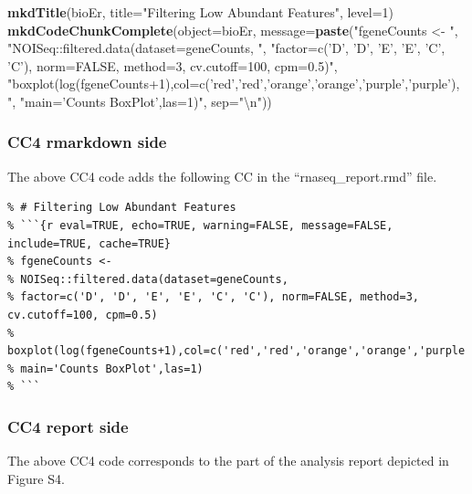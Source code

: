 \documentclass[]{article}
\newenvironment{Shaded}{\begin{snugshade}}{\end{snugshade}}
\newcommand{\CharTok}[1]{\textcolor[rgb]{0.31,0.60,0.02}{#1}}
\newcommand{\DataTypeTok}[1]{\textcolor[rgb]{0.13,0.29,0.53}{#1}}
\newcommand{\DecValTok}[1]{\textcolor[rgb]{0.00,0.00,0.81}{#1}}
\newcommand{\KeywordTok}[1]{\textcolor[rgb]{0.13,0.29,0.53}{\textbf{#1}}}
\newcommand{\NormalTok}[1]{#1}
\newcommand{\StringTok}[1]{\textcolor[rgb]{0.31,0.60,0.02}{#1}}
\begin{document}
\begin{Shaded}
\begin{Highlighting}[]
\KeywordTok{mkdTitle}\NormalTok{(bioEr, }\DataTypeTok{title=}\StringTok{"Filtering Low Abundant Features"}\NormalTok{, }\DataTypeTok{level=}\DecValTok{1}\NormalTok{)}
\KeywordTok{mkdCodeChunkComplete}\NormalTok{(}\DataTypeTok{object=}\NormalTok{bioEr, }\DataTypeTok{message=}\KeywordTok{paste}\NormalTok{(}\StringTok{"fgeneCounts <- "}\NormalTok{,}
              \StringTok{"NOISeq::filtered.data(dataset=geneCounts, "}\NormalTok{,}
              \StringTok{"factor=c('D', 'D', 'E', 'E', 'C', 'C'), norm=FALSE, method=3, cv.cutoff=100, cpm=0.5)"}\NormalTok{,}
              \StringTok{"boxplot(log(fgeneCounts+1),col=c('red','red','orange','orange','purple','purple'), "}\NormalTok{,}
              \StringTok{"main='Counts BoxPlot',las=1)"}\NormalTok{, }\DataTypeTok{sep=}\StringTok{"}\CharTok{\textbackslash{}n}\StringTok{"}\NormalTok{))}
\end{Highlighting}
\end{Shaded}

\hypertarget{cc4-rmarkdown-side}{%
\subsubsection{CC4 rmarkdown side}\label{cc4-rmarkdown-side}}

The above CC4 code adds the following CC in the ``rnaseq\_report.rmd''
file.

\begin{verbatim}
% # Filtering Low Abundant Features
% ```{r eval=TRUE, echo=TRUE, warning=FALSE, message=FALSE, include=TRUE, cache=TRUE}
% fgeneCounts <- 
% NOISeq::filtered.data(dataset=geneCounts, 
% factor=c('D', 'D', 'E', 'E', 'C', 'C'), norm=FALSE, method=3, cv.cutoff=100, cpm=0.5)
% boxplot(log(fgeneCounts+1),col=c('red','red','orange','orange','purple','purple'), 
% main='Counts BoxPlot',las=1)
% ```
\end{verbatim}

\hypertarget{cc4-report-side}{%
\subsubsection{CC4 report side}\label{cc4-report-side}}

The above CC4 code corresponds to the part of the analysis report
depicted in Figure S4.
\end{document}
